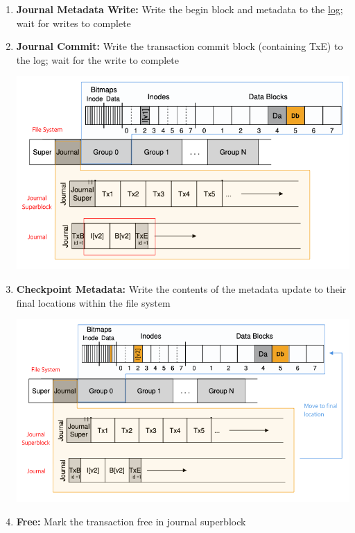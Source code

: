 \documentclass[12pt]{article}
\begin{document}
\begin{itemize}
\begin{enumerate}[1.]
        \item \textbf{Journal Metadata Write:} Write the begin block and metadata to the \underline{log};
        wait for writes to complete

        \item \textbf{Journal Commit:} Write the transaction commit block (containing TxE) to
        the log; wait for the write to complete


        \begin{center}
        \includegraphics[width=0.8\linewidth]{../images/midterm_4_solution_44.png}
        \end{center}

        \item \textbf{Checkpoint Metadata:} Write the contents of the metadata update
        to their final locations within the file system

        \begin{center}
        \includegraphics[width=0.8\linewidth]{../images/midterm_4_solution_45.png}
        \end{center}
        \item \textbf{Free:} Mark the transaction free in journal superblock


\end{enumerate}
\end{itemize}
\end{document}
